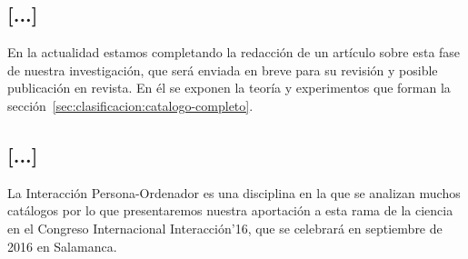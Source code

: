 \subsection{[...]}
En la actualidad estamos completando la redacción de un artículo sobre esta fase de nuestra investigación, que será enviada en breve para su revisión y posible publicación en revista. En él se exponen la teoría y experimentos que forman la sección~\ref{sec:clasificacion:catalogo-completo}.




\subsection{[...]}
La Interacción Persona-Ordenador es una disciplina en la que se analizan muchos catálogos por lo que presentaremos nuestra aportación a esta rama de la ciencia en el Congreso Internacional Interacción'16, que se celebrará en septiembre de 2016 en Salamanca.